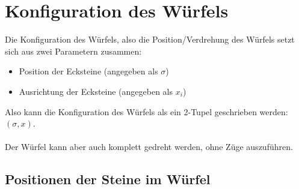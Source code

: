\documentclass[12pt,a4paper, usenames, dvipsnames]{article}
\begin{document}









\section{Konfiguration des Würfels}
Die Konfiguration des Würfels, also die Position/Verdrehung des Würfels setzt sich aus zwei Parametern zusammen: 
\begin{itemize}
\item Position der Ecksteine (angegeben als $\sigma$)
\item Ausrichtung der Ecksteine (angegeben als $x_i$)
\end{itemize}
Also kann die Konfiguration des Würfels als ein 2-Tupel geschrieben werden: $(\sigma, x)$. \\
\\
Der Würfel kann aber auch komplett gedreht werden, ohne Züge auszuführen.



















\subsection*{Positionen der Steine im Würfel} 
\end{document}
